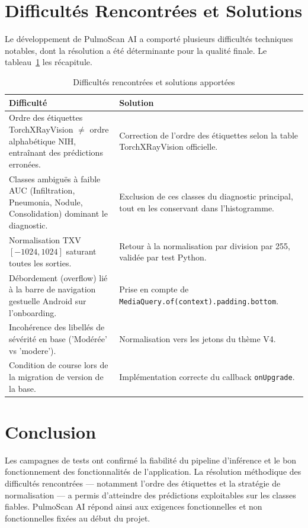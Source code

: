 \documentclass[12pt,a4paper]{report}
\begin{document}
\section{Difficultés Rencontrées et Solutions}
Le développement de PulmoScan AI a comporté plusieurs difficultés techniques notables, dont la résolution a été déterminante pour la qualité finale. Le tableau~\ref{tab:difficulties} les récapitule.

\begin{table}[H]
\centering
\caption{Difficultés rencontrées et solutions apportées}
\label{tab:difficulties}
\begin{tabularx}{\textwidth}{X X}
\toprule
\textbf{Difficulté} & \textbf{Solution} \\
\midrule
Ordre des étiquettes TorchXRayVision $\neq$ ordre alphabétique NIH, entraînant des prédictions erronées. & Correction de l'ordre des étiquettes selon la table TorchXRayVision officielle. \\
Classes ambiguës à faible AUC (Infiltration, Pneumonia, Nodule, Consolidation) dominant le diagnostic. & Exclusion de ces classes du diagnostic principal, tout en les conservant dans l'histogramme. \\
Normalisation TXV $[-1024,1024]$ saturant toutes les sorties. & Retour à la normalisation par division par 255, validée par test Python. \\
Débordement (overflow) lié à la barre de navigation gestuelle Android sur l'onboarding. & Prise en compte de \texttt{MediaQuery.of(context).padding.bottom}. \\
Incohérence des libellés de sévérité en base ('Modérée' vs 'modere'). & Normalisation vers les jetons du thème V4. \\
Condition de course lors de la migration de version de la base. & Implémentation correcte du callback \texttt{onUpgrade}. \\
\bottomrule
\end{tabularx}
\end{table}

\section*{Conclusion}
Les campagnes de tests ont confirmé la fiabilité du pipeline d'inférence et le bon fonctionnement des fonctionnalités de l'application. La résolution méthodique des difficultés rencontrées --- notamment l'ordre des étiquettes et la stratégie de normalisation --- a permis d'atteindre des prédictions exploitables sur les classes fiables. PulmoScan AI répond ainsi aux exigences fonctionnelles et non fonctionnelles fixées au début du projet.
\end{document}
